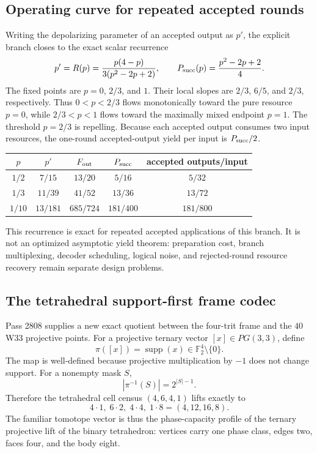 \subsection{Operating curve for repeated accepted rounds}
Writing the depolarizing parameter of an accepted output as $p'$, the explicit branch
closes to the exact scalar recurrence
\[
 p'=R(p)=\frac{p(4-p)}{3(p^2-2p+2)},
 \qquad
 P_{\rm succ}(p)=\frac{p^2-2p+2}{4}.
\]
The fixed points are $p=0$, $2/3$, and $1$. Their local slopes are $2/3$, $6/5$, and
$2/3$, respectively. Thus $0<p<2/3$ flows monotonically toward the pure resource
$p=0$, while $2/3<p<1$ flows toward the maximally mixed endpoint $p=1$. The threshold
$p=2/3$ is repelling. Because each accepted output consumes two input resources, the
one-round accepted-output yield per input is $P_{\rm succ}/2$.

\begin{center}
\begin{tabular}{@{}ccccc@{}}
\toprule
$p$ & $p'$ & $F_{\rm out}$ & $P_{\rm succ}$ & accepted outputs/input\\
\midrule
$1/2$ & $7/15$ & $13/20$ & $5/16$ & $5/32$\\
$1/3$ & $11/39$ & $41/52$ & $13/36$ & $13/72$\\
$1/10$ & $13/181$ & $685/724$ & $181/400$ & $181/800$\\
\bottomrule
\end{tabular}
\end{center}

This recurrence is exact for repeated accepted applications of this branch. It is not an
optimized asymptotic yield theorem: preparation cost, branch multiplexing, decoder
scheduling, logical noise, and rejected-round resource recovery remain separate design
problems.

\subsection{The tetrahedral support-first frame codec}
Pass 2808 supplies a new exact quotient between the four-trit frame and the $40$ W33
projective points. For a projective ternary vector $[x]\in PG(3,3)$, define
\[
 \pi([x])=\operatorname{supp}(x)\in\mathbb F_2^4\setminus\{0\}.
\]
The map is well-defined because projective multiplication by $-1$ does not change support.
For a nonempty mask $S$,
\[
 \boxed{|\pi^{-1}(S)|=2^{|S|-1}}.
\]
Therefore the tetrahedral cell census $(4,6,4,1)$ lifts exactly to
\[
 \boxed{4\cdot1,\;6\cdot2,\;4\cdot4,\;1\cdot8=(4,12,16,8)}.
\]
The familiar tomotope vector is thus the phase-capacity profile of the ternary projective
lift of the binary tetrahedron: vertices carry one phase class, edges two, faces four,
and the body eight.


